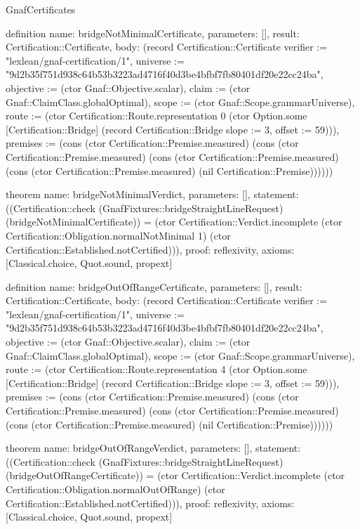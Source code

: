 \begin{lexlean}{GnafCertificates}
\begin{semanticmodule}
definition{
  name: bridgeNotMinimalCertificate,
  parameters: [],
  result: Certification::Certificate,
  body: (record Certification::Certificate {verifier := "lexlean/gnaf-certification/1", universe := "9d2b35f751d938c64b53b3223ad4716f40d3be4bfbf7fb80401df20e22cc24ba", objective := (ctor Gnaf::Objective.scalar), claim := (ctor Gnaf::ClaimClass.globalOptimal), scope := (ctor Gnaf::Scope.grammarUniverse), route := (ctor Certification::Route.representation 0 (ctor Option.some [Certification::Bridge] (record Certification::Bridge {slope := 3, offset := 59}))), premises := (cons (ctor Certification::Premise.measured) (cons (ctor Certification::Premise.measured) (cons (ctor Certification::Premise.measured) (cons (ctor Certification::Premise.measured) (nil Certification::Premise)))))})
}

theorem{
  name: bridgeNotMinimalVerdict,
  parameters: [],
  statement: ((Certification::check (GnafFixtures::bridgeStraightLineRequest) (bridgeNotMinimalCertificate)) = (ctor Certification::Verdict.incomplete (ctor Certification::Obligation.normalNotMinimal 1) (ctor Certification::Established.notCertified))),
  proof: reflexivity{},
  axioms: [Classical.choice, Quot.sound, propext]
}

definition{
  name: bridgeOutOfRangeCertificate,
  parameters: [],
  result: Certification::Certificate,
  body: (record Certification::Certificate {verifier := "lexlean/gnaf-certification/1", universe := "9d2b35f751d938c64b53b3223ad4716f40d3be4bfbf7fb80401df20e22cc24ba", objective := (ctor Gnaf::Objective.scalar), claim := (ctor Gnaf::ClaimClass.globalOptimal), scope := (ctor Gnaf::Scope.grammarUniverse), route := (ctor Certification::Route.representation 4 (ctor Option.some [Certification::Bridge] (record Certification::Bridge {slope := 3, offset := 59}))), premises := (cons (ctor Certification::Premise.measured) (cons (ctor Certification::Premise.measured) (cons (ctor Certification::Premise.measured) (cons (ctor Certification::Premise.measured) (nil Certification::Premise)))))})
}

theorem{
  name: bridgeOutOfRangeVerdict,
  parameters: [],
  statement: ((Certification::check (GnafFixtures::bridgeStraightLineRequest) (bridgeOutOfRangeCertificate)) = (ctor Certification::Verdict.incomplete (ctor Certification::Obligation.normalOutOfRange) (ctor Certification::Established.notCertified))),
  proof: reflexivity{},
  axioms: [Classical.choice, Quot.sound, propext]
}


\end{semanticmodule}
\end{lexlean}
